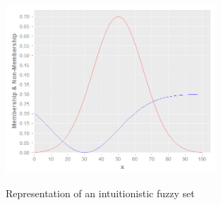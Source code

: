 \begin{figure}
\caption{Representation of an intuitionistic fuzzy set} \centering
\includegraphics[width=0.7\textwidth]{img/example-of-ifs.png}
\label{figure:example-of-ifs}
\end{figure}
